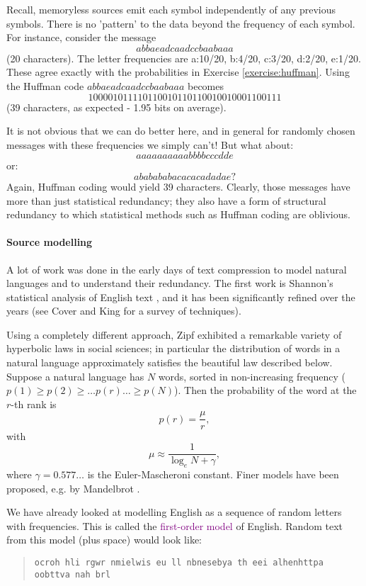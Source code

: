 \documentclass[a4paper, 11pt, openany]{book}
\numberwithin{equation}{section}
\theoremstyle{plain}
\theoremstyle{definition}
\newcommand{\Define}[1]{\textcolor{purple}{#1}}
\begin{document}
Recall, memoryless sources emit each symbol independently of any previous symbols. There is no 'pattern' to the data beyond the frequency of each symbol. For instance, consider the message 
\[
    abbaeadcaadccbaabaaa
\]
(20 characters). The letter frequencies are a:10/20, b:4/20, c:3/20, d:2/20, e:1/20. These agree exactly with the probabilities in Exercise \ref{exercise:huffman}. Using the Huffman code $abbaeadcaadccbaabaaa$ becomes
\[
    100001011110110010110110010010001100111
\]
(39 characters, as expected - 1.95 bits on average). 

It is not obvious that we can do better here, and in general for randomly chosen messages with these frequencies we simply can't! But what about: 
\[
    aaaaaaaaaabbbbcccdde
\]
or: 
\[
    ababababacacacadadae ?
\]
Again, Huffman coding would yield 39 characters. Clearly, those messages have more than just statistical redundancy; they also have a form of structural redundancy to which statistical methods such as Huffman coding are oblivious.





\paragraph{Source modelling}

A lot of work was done in the early days of text compression to model natural languages and to understand their redundancy. The first work is Shannon's statistical analysis of English text \cite{Sha51}, and it has been significantly refined over the years (see Cover and King \cite{CK78} for a survey of techniques). 

Using a completely different approach, Zipf \cite{Zip49} exhibited a remarkable variety of hyperbolic laws in social sciences; in particular the distribution of words in a natural language approximately satisfies the beautiful law described below. Suppose a natural language has $N$ words, sorted in non-increasing frequency ($p(1) \ge p(2) \ge \dots p(r) \dots \ge p(N)$). Then the probability of the word at the $r$-th rank is
\[
    p(r) = \frac{ \mu }{ r },
\]
with
\[
    \mu \approx \frac{ 1 }{ \log_e N + \gamma },
\]
where $\gamma = 0.577\dots$ is the Euler-Mascheroni constant. Finer models have been proposed, e.g. by Mandelbrot \cite{Man52}.

We have already looked at modelling English as a sequence of random letters with frequencies. This is called the \Define{first-order model} of English. Random text from this model (plus space) would look like:
\begin{quote}
    \texttt{ocroh hli rgwr nmielwis eu ll nbnesebya th eei alhenhttpa oobttva nah brl}
\end{quote}
\end{document}

